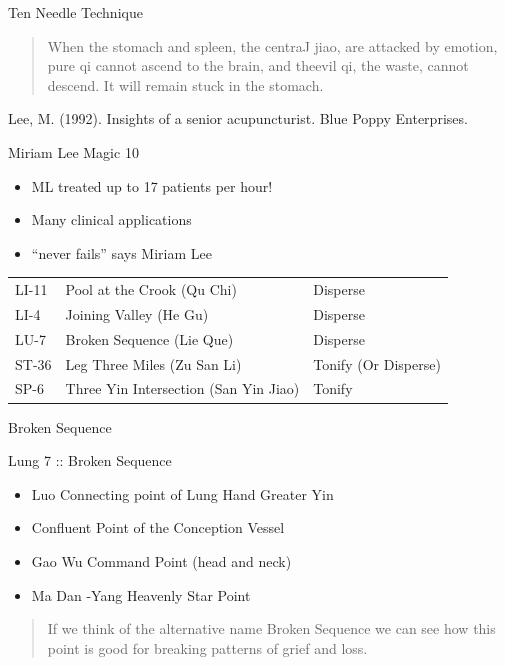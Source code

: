 \begin{frame}{Ten Needle Technique}
\begin{quote}     
When the stomach and spleen, the centraJ jiao, are attacked by
emotion, pure qi cannot ascend to the brain, and theevil qi, the
waste, cannot descend. It will remain stuck in the stomach.
\end{quote}

Lee, M. (1992). Insights of a senior acupuncturist. Blue Poppy
Enterprises.

\end{frame}

\begin{frame}{Miriam Lee Magic 10}
\begin{itemize}
\item ML treated up to 17 patients per hour!
\item Many clinical applications
\item ``never fails'' says Miriam Lee
\end{itemize}

\begin{table}[]
\begin{tabular}{@{}lll@{}}
\toprule
LI-11 & Pool at the Crook (Qu Chi)            & Disperse             \\
LI-4  & Joining Valley (He Gu)                & Disperse             \\
LU-7  & Broken Sequence (Lie Que)             & Disperse             \\
ST-36 & Leg Three Miles (Zu San Li)           & Tonify (Or Disperse) \\
SP-6  & Three Yin Intersection (San Yin Jiao) & Tonify               \\ \bottomrule
\end{tabular}
\end{table}

\end{frame}

\begin{frame}{Broken Sequence}

\large{Lung 7 :: Broken Sequence}

\begin{itemize}
\item Luo Connecting point of Lung Hand Greater Yin
\item Confluent Point of the Conception Vessel
\item Gao Wu Command Point (head and neck)
\item Ma Dan -Yang Heavenly Star Point
\end{itemize}

\vspace{1em}

\begin{quote}
If we think of the alternative name Broken Sequence we can see how this point is good for breaking patterns of grief and loss.
\end{quote}

\end{frame}


